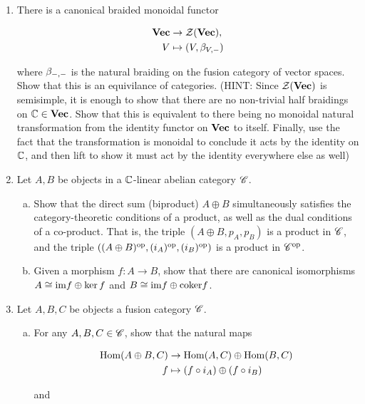 \documentclass{article}
\theoremstyle{definition}
\numberwithin{figure}{section}
\begin{document}
\begin{enumerate}[\thesection .1.]
\item There is a canonical braided monoidal functor

\begin{align*}
\bold{Vec} &\to \mathcal{Z}(\bold{Vec}),\\
V &\mapsto (V,\beta_{V,\--})
\end{align*}

where $\beta_{\--,\--}$ is the natural braiding on the fusion category of vector spaces. Show that this is an equivilance of categories. (HINT: Since $\mathcal{Z}(\bold{Vec})$ is semisimple, it is enough to show that there are no non-trivial half braidings on $\mathbb{C}\in \bold{Vec}$. Show that this is equivalent to there being no monoidal natural transformation from the identity functor on $\bold{Vec}$ to itself. Finally, use the fact that the transformation is monoidal to conclude it acts by the identity on $\mathbb{C}$, and then lift to show it must act by the identity everywhere else as well)

\item Let $A,B$ be objects in a $\mathbb{C}$-linear abelian category $\mathscr{C}$.

\begin{enumerate}[(a)]
\item Show that the direct sum (biproduct) $A\oplus B$ simultaneously satisfies the category-theoretic conditions of a product, as well as the dual conditions of a co-product. That is, the triple $(A\oplus B, p_A, p_B)$ is a product in $\mathscr{C}$, and the triple $((A\oplus B)^{\mathrm{op}}, (i_A)^{\mathrm{op}},(i_B)^{\mathrm{op}})$ is a product in $\mathscr{C}^{\mathrm{op}}$.

\item Given a morphism $f:A\to B$, show that there are canonical isomorphisms $A\cong \mathrm{im} f\oplus \ker f$ and $B\cong \mathrm{im} f\oplus \mathrm{coker} f$.
\end{enumerate}

\item Let $A,B,C$ be objects a fusion category $\mathscr{C}$.

\begin{enumerate}[(a)]

\item For any $A,B,C\in \mathscr{C}$, show that the natural maps

\begin{align*}
\mathrm{Hom}(A\oplus B,C)&\to \mathrm{Hom}(A,C)\oplus \mathrm{Hom}(B,C)\\
f & \mapsto (f\circ i_A)\oplus (f\circ i_B)
\end{align*}

and


\end{enumerate}
\end{enumerate}
\end{document}
